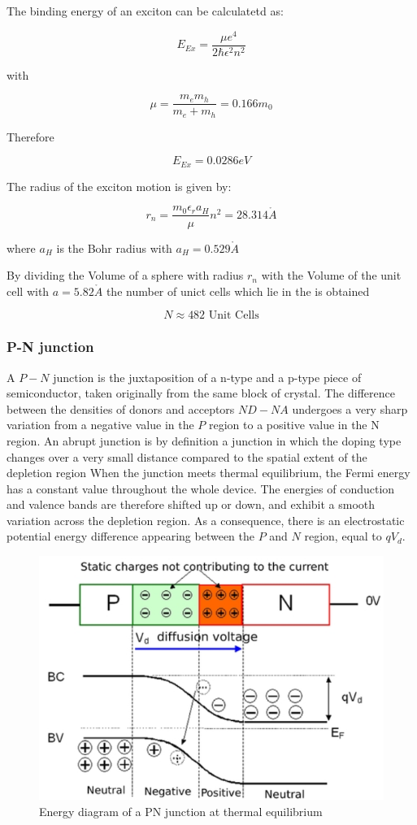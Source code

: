 The binding energy of an exciton can be calculatetd as:

$$E_{Ex} = \frac{\mu e^4}{2\hbar \epsilon^2 n^2}$$

with 

$$\mu = \frac{m_em_h}{m_e+m_h} = 0.166m_0$$

Therefore

$$E_{Ex} = 0.0286 eV$$

The radius of the exciton motion is given by:

$$r_n = \frac{m_0 \epsilon_r a_H}{\mu} n^2= 28.314 \mathring{A}$$

where $a_H$ is the Bohr radius with $a_H = 0.529 \mathring{A}$

By dividing the Volume of a sphere with radius $r_n$ with the Volume
of the unit cell with $a=5.82 \mathring{A}$ the number of unict 
cells which lie in the is obtained

$$N \approx 482 \textrm{ Unit Cells}$$

\subsubsection*{P-N junction}

A $P-N$ junction is the juxtaposition of a n-type and a p-type piece of semiconductor, taken originally from the same block of crystal. The difference between the densities of donors and acceptors $ND - NA$ undergoes a very sharp variation from a negative value in the $P$ region to a positive value in the N region. An abrupt junction is by definition a junction in which the doping type changes over a very small distance compared to the spatial extent of the depletion region
When the junction meets thermal equilibrium, the Fermi energy has a constant value throughout the whole device. The energies of conduction and valence bands are therefore shifted up or down, and exhibit a smooth variation across the depletion region. As a consequence, there is an electrostatic potential energy difference appearing between the $P$ and $N$ region, equal to $qV_d$.

\begin{figure}[H]
  \centering
  \includegraphics[width=0.6\linewidth]{Graphics/Chapter3/PNjunction.PNG}
  \caption{Energy diagram of a PN junction at thermal equilibrium\cite{PN}}
  \label{fig:PNjunction}
\end{figure}

